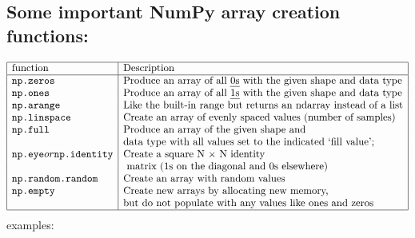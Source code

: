 \documentclass[11pt]{article}
\begin{document}
\hypertarget{some-important-numpy-array-creation-functions}{%
\subsection{Some important NumPy array creation
functions:}\label{some-important-numpy-array-creation-functions}}
$$
\begin{array}{|l|l|}
  \hline
\text{function}& \text{Description}\\
\hline
\texttt{np.zeros} &\text{Produce an array of all \emph{0s} with the given
shape and data type} \\
\texttt{np.ones} &\text{Produce an array of all \emph{1s} with the given
shape and data type} \\
\texttt{np.arange} &\text{Like the built-in range but returns an ndarray
instead of a list} \\
\texttt{np.linspace} &\text{Create an array of evenly spaced values (number
of samples)} \\
\texttt{np.full} &\text{Produce an array of the given shape and}\\
& \text{data type with all values set to the indicated `fill value';} \\
\texttt{np.eye} or \texttt{np.identity} &\text{Create a square N × N identity}\\
& \text{
matrix (1s on the diagonal and 0s elsewhere)} \\
\texttt{np.random.random} &\text{Create an array with random values} \\
\texttt{np.empty} &\text{Create new arrays by allocating new memory, }\\
& \text{but do
not populate with any values like ones and zeros} \\
\hline
\end{array}
$$
examples:
\end{document}
